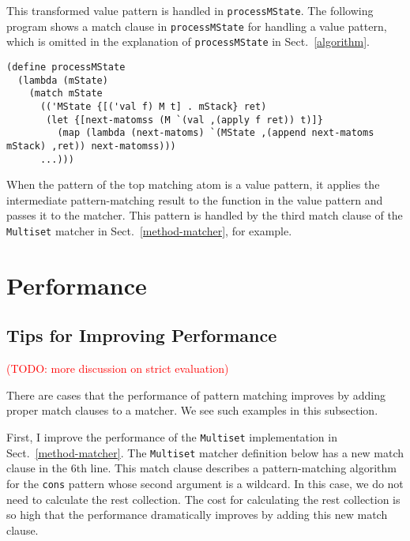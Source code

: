 \documentclass[acmlarge]{acmart}
\newcommand{\todo}[1]{\textcolor{red}{(TODO: #1)}}
\begin{document}
This transformed value pattern is handled in \texttt{processMState}.
The following program shows a match clause in \texttt{processMState} for handling a value pattern, which is omitted in the explanation of \texttt{processMState} in Sect.~\ref{algorithm}.

\begin{lstlisting}[language=egison]
(define processMState
  (lambda (mState)
    (match mState
      (('MState {[('val f) M t] . mStack} ret)
       (let {[next-matomss (M `(val ,(apply f ret)) t)]}
         (map (lambda (next-matoms) `(MState ,(append next-matoms mStack) ,ret)) next-matomss)))
      ...)))
\end{lstlisting}

\noindent
When the pattern of the top matching atom is a value pattern, it applies the intermediate pattern-matching result to the function in the value pattern and passes it to the matcher.
This pattern is handled by the third match clause of the \texttt{Multiset} matcher in Sect.~\ref{method-matcher}, for example.

\section{Performance}\label{performance}
%

\subsection{Tips for Improving Performance}\label{tip}

\todo{more discussion on strict evaluation}

There are cases that the performance of pattern matching improves by adding proper match clauses to a matcher.
We see such examples in this subsection.

First, I improve the performance of the \texttt{Multiset} implementation in Sect.~\ref{method-matcher}.
The \texttt{Multiset} matcher definition below has a new match clause in the 6th line.
This match clause describes a pattern-matching algorithm for the \texttt{cons} pattern whose second argument is a wildcard.
In this case, we do not need to calculate the rest collection.
The cost for calculating the rest collection is so high that the performance dramatically improves by adding this new match clause.
\end{document}
